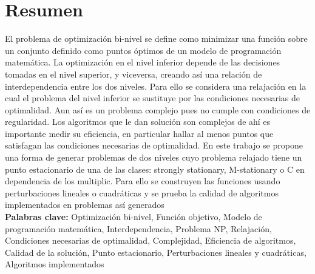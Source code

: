\chapter*{Resumen}
El problema de optimización bi-nivel se define como minimizar una función sobre un conjunto definido como puntos óptimos de un modelo de programación matemática. La optimización en el nivel inferior depende de las decisiones tomadas en el nivel superior, y viceversa, creando así una relación de interdependencia entre los dos niveles.
Para ello se considera una relajación en la cual el problema del nivel inferior se sustituye por las condiciones necesarias de optimalidad. Aun así es un problema complejo pues no cumple con condiciones de regularidad. Los algoritmos que le dan solución son complejos de ahí es importante medir su eficiencia, en particular hallar al menos puntos que satisfagan las condiciones necesarias de optimalidad.
En este trabajo se propone una forma de generar problemas de dos niveles cuyo problema relajado tiene un punto estacionario de una de las clases: strongly stationary, M-stationary o C en dependencia de los multiplic.
Para ello se construyen las funciones usando perturbaciones lineales o cuadráticas y se prueba la calidad de algoritmos implementados en problemas así 
generados\\
\textbf{Palabras clave:} Optimización bi-nivel, Función objetivo, Modelo de programación matemática, Interdependencia, Problema NP, Relajación, Condiciones necesarias de optimalidad, Complejidad, Eficiencia de algoritmos, Calidad de la solución, Punto estacionario, Perturbaciones lineales y cuadráticas, Algoritmos implementados

